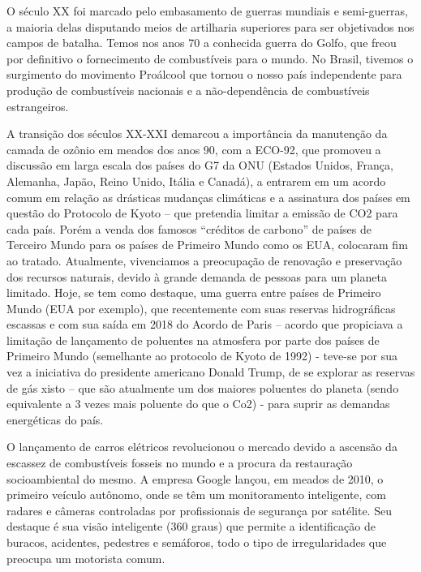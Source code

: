\documentclass[a4paper, 12pt]{article}
\begin{document}
    O século XX foi marcado pelo embasamento de guerras mundiais e semi-guerras, a maioria delas disputando meios de artilharia superiores para ser objetivados nos campos de batalha. Temos nos anos 70 a conhecida guerra do Golfo, que freou por definitivo o fornecimento de combustíveis para o mundo. No Brasil, tivemos o surgimento do movimento Proálcool que tornou o nosso país independente para produção de combustíveis nacionais e a não-dependência de combustíveis estrangeiros.
    
    A transição dos séculos XX-XXI demarcou a importância da manutenção da camada de ozônio em meados dos anos 90, com a ECO-92, que promoveu a discussão em larga escala dos países do G7 da ONU (Estados Unidos, França, Alemanha, Japão, Reino Unido, Itália e Canadá), a entrarem em um acordo comum em relação as drásticas mudanças climáticas e a assinatura dos países em questão do Protocolo de Kyoto – que pretendia limitar a emissão de CO2 para cada país. Porém a venda dos famosos “créditos de carbono” de países de Terceiro Mundo para os países de Primeiro Mundo como os EUA, colocaram fim ao tratado.   
    Atualmente, vivenciamos a preocupação de renovação e preservação dos recursos naturais, devido à grande demanda de pessoas para um planeta limitado. Hoje, se tem como destaque, uma guerra entre países de Primeiro Mundo (EUA por exemplo), que recentemente com suas reservas hidrográficas escassas e com sua saída em 2018 do Acordo de Paris – acordo que propiciava a limitação de lançamento de poluentes na atmosfera por parte dos países de Primeiro Mundo (semelhante ao protocolo de Kyoto de 1992) -  teve-se por sua vez a iniciativa do presidente americano Donald Trump, de se explorar as reservas de gás xisto – que são atualmente um dos maiores poluentes do planeta (sendo equivalente a 3 vezes mais poluente do que o Co2) -  para suprir  as demandas energéticas do país.

    O lançamento de carros elétricos revolucionou o mercado devido a ascensão da escassez de combustíveis fosseis no mundo e a procura da restauração socioambiental do mesmo. A empresa Google lançou, em meados de 2010, o primeiro veículo autônomo, onde se têm um monitoramento inteligente, com radares e câmeras controladas por profissionais de segurança por satélite. Seu destaque é sua visão inteligente (360 graus) que permite a identificação de buracos, acidentes, pedestres e semáforos, todo o tipo de irregularidades que preocupa um motorista comum.
\end{document}
